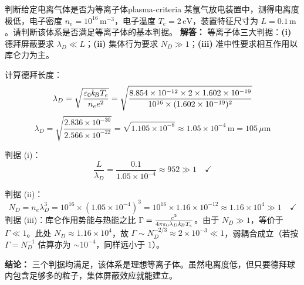 \begin{example}{判断给定电离气体是否为等离子体}{plasma-criteria}
某氩气放电装置中，测得电离度极低，电子密度 $n_e = 10^{16}\,\mathrm{m}^{-3}$，电子温度 $T_e = 2\,\mathrm{eV}$，装置特征尺寸为 $L = 0.1\,\mathrm{m}$。请判断该体系是否满足等离子体的基本判据。
\tcblower
\textbf{解答：}
等离子体三大判据：\textbf{(i)} 德拜屏蔽要求 $\lambda_D\ll L$；\textbf{(ii)} 集体行为要求 $N_D\gg 1$；\textbf{(iii)} 准中性要求相互作用以库仑力为主。

计算德拜长度：
\[
\lambda_D = \sqrt{\frac{\varepsilon_0 k_{\!B}T_e}{n_e e^2}} = \sqrt{\frac{8.854\times 10^{-12}\times 2\times 1.602\times 10^{-19}}{10^{16}\times (1.602\times 10^{-19})^2}}
\]
\[
\lambda_D = \sqrt{\frac{2.836\times 10^{-30}}{2.566\times 10^{-22}}} = \sqrt{1.105\times 10^{-8}} \approx 1.05\times 10^{-4}\,\mathrm{m} = 105\,\mu\mathrm{m}
\]

判据 (i)：
\[
\frac{L}{\lambda_D} = \frac{0.1}{1.05\times 10^{-4}} \approx 952 \gg 1 \quad \checkmark
\]

判据 (ii)：
\[
N_D = n_e \lambda_D^3 = 10^{16}\times (1.05\times 10^{-4})^3 = 10^{16}\times 1.16\times 10^{-12} \approx 1.16\times 10^{4} \gg 1 \quad \checkmark
\]
判据 (iii)：库仑作用势能与热能之比 $\Gamma = \frac{e^2}{4\pi\varepsilon_0\lambda_D k_{\!B}T_e}$。由于 $N_D\gg 1$，等价于 $\Gamma\ll 1$。此处 $N_D\approx 1.16\times10^4$，故 $\Gamma \sim N_D^{-2/3}\approx 2\times10^{-3}\ll 1$，弱耦合成立（若按 $\Gamma = N_D^{-1}$ 估算亦为 $\sim10^{-4}$，同样远小于 $1$）。

\textbf{结论：} 三个判据均满足，该体系是理想等离子体。虽然电离度低，但只要德拜球内包含足够多的粒子，集体屏蔽效应就能建立。
\end{example}

